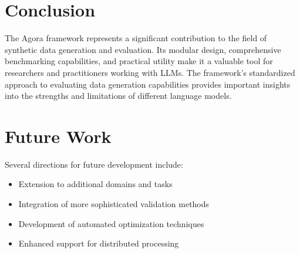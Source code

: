 \documentclass[10pt,conference]{IEEEtran}
\begin{document}
\section{Conclusion}
The Agora framework represents a significant contribution to the field of synthetic data generation and evaluation. Its modular design, comprehensive benchmarking capabilities, and practical utility make it a valuable tool for researchers and practitioners working with LLMs. The framework's standardized approach to evaluating data generation capabilities provides important insights into the strengths and limitations of different language models.

\section{Future Work}
Several directions for future development include:
\begin{itemize}
    \item Extension to additional domains and tasks
    \item Integration of more sophisticated validation methods
    \item Development of automated optimization techniques
    \item Enhanced support for distributed processing
\end{itemize}
\end{document}

